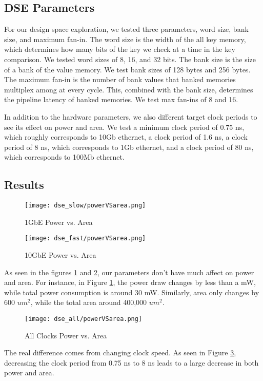 \subsection{DSE Parameters}

For our design space exploration, we tested three parameters, word size,
bank size, and maximum fan-in. The word size is the width of the all key
memory, which determines how many bits of the key we check at a time in the
key comparison. We tested word sizes of 8, 16, and 32 bits. The bank size is
the size of a bank of the value memory. We test bank sizes of 128 bytes and
256 bytes. The maximum fan-in is the number of bank values that banked
memories multiplex among at every cycle. This, combined with the bank size,
determines the pipeline latency of banked memories. We test max fan-ins of
8 and 16.

In addition to the hardware parameters, we also different target clock periods
to see its effect on power and area. We test a minimum clock period of 0.75 ns,
which roughly corresponds to 10Gb ethernet, a clock period of 1.6 ns,
a clock period of 8 ns, which corresponds to 1Gb ethernet, and a clock period
of 80 ns, which corresponds to 100Mb ethernet.

\subsection{Results}

\begin{figure}
    \begin{center}
        \texttt{[image: dse\_slow/powerVSarea.png]}
        \caption{1GbE Power vs. Area}
        \label{fig:slow-pva}
    \end{center}
\end{figure}

\begin{figure}
    \begin{center}
        \texttt{[image: dse\_fast/powerVSarea.png]}
        \caption{10GbE Power vs. Area}
        \label{fig:fast-pva}
    \end{center}
\end{figure}

As seen in the figures \ref{fig:slow-pva} and \ref{fig:fast-pva}, our
parameters don't have much affect on power and area. For instance, in Figure
\ref{fig:slow-pva}, the power draw changes by less than a mW, while total
power consumption is around 30 mW. Similarly, area only changes by 600 \(um^2\),
while the total area around 400,000 \(um^2\).

\begin{figure}
    \begin{center}
        \texttt{[image: dse\_all/powerVSarea.png]}
        \caption{All Clocks Power vs. Area}
        \label{fig:all-pva}
    \end{center}
\end{figure}

The real difference comes from changing clock speed. As seen in Figure
\ref{fig:all-pva}, decreasing the clock period from 0.75 ns to 8 ns leads to
a large decrease in both power and area.
